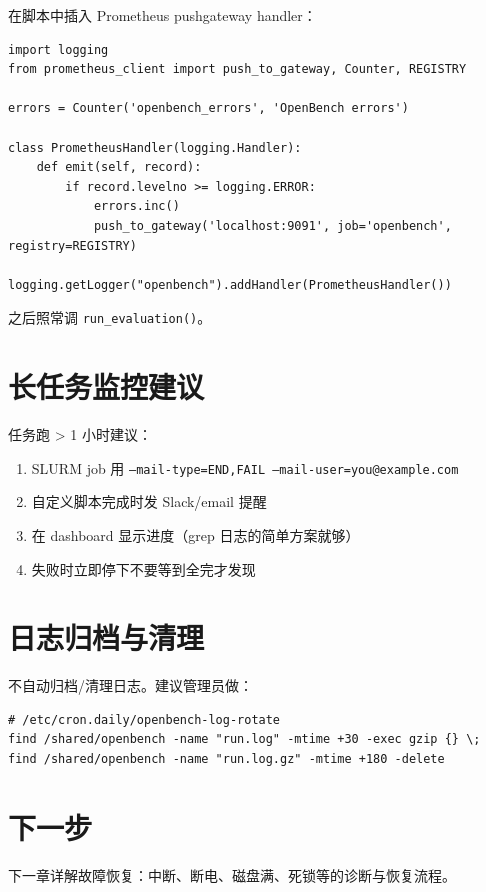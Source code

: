在脚本中插入 Prometheus pushgateway handler：

\begin{verbatim}
import logging
from prometheus_client import push_to_gateway, Counter, REGISTRY

errors = Counter('openbench_errors', 'OpenBench errors')

class PrometheusHandler(logging.Handler):
    def emit(self, record):
        if record.levelno >= logging.ERROR:
            errors.inc()
            push_to_gateway('localhost:9091', job='openbench', registry=REGISTRY)

logging.getLogger("openbench").addHandler(PrometheusHandler())
\end{verbatim}

之后照常调 \texttt{run\_evaluation()}。

\section{长任务监控建议}

任务跑 > 1 小时建议：

\begin{enumerate}
  \item SLURM job 用 \texttt{--mail-type=END,FAIL --mail-user=you@example.com}
  \item 自定义脚本完成时发 Slack/email 提醒
  \item 在 dashboard 显示进度（grep 日志的简单方案就够）
  \item 失败时立即停下不要等到全完才发现
\end{enumerate}

\section{日志归档与清理}

\openbench{} 不自动归档/清理日志。建议管理员做：

\begin{verbatim}
# /etc/cron.daily/openbench-log-rotate
find /shared/openbench -name "run.log" -mtime +30 -exec gzip {} \;
find /shared/openbench -name "run.log.gz" -mtime +180 -delete
\end{verbatim}

\section{下一步}

下一章详解故障恢复：中断、断电、磁盘满、死锁等的诊断与恢复流程。

